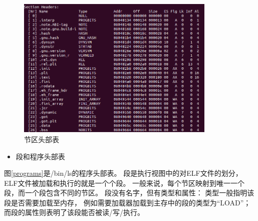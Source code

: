 
\begin{figure}[h!]
  \centering
  \includegraphics[width=0.85\textwidth]{figure/sections.png}
  \caption{节区头部表}
  \label{sections}
\end{figure}

\begin{itemize}
  \item 段和程序头部表
\end{itemize}

图\ref{programs}是/bin/ls的程序头部表。
段是执行视图中的对ELF文件的划分，
ELF文件被加载和执行的就是一个个段。
一般来说，每个节区映射到唯一一个段，而一个段包含不同的节区。
段没有名字，但有类型和属性：
类型一般指明该段是否需要加载至内存，
例如需要加载器加载到主存中的段的类型为“LOAD”；
而段的属性则表明了该段能否被读/写/执行。

